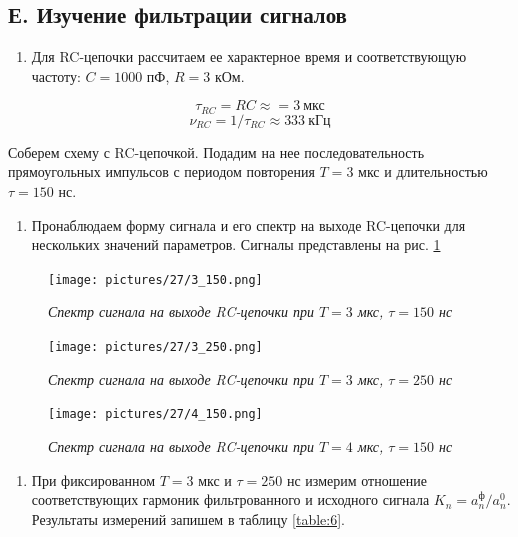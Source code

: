 \documentclass[a4paper,12pt]{article}
\begin{document}
\subsection{Е. Изучение фильтрации сигналов}

\begin{enumerate}[resume]
    \item Для RC-цепочки рассчитаем ее характерное время и соответствующую частоту: $C = 1000$ пФ, $R = 3$ кОм.
\end{enumerate}

\begin{equation*}
    \tau_{RC} = RC \approx = 3 \ \text{мкс}
\end{equation*}
\begin{equation*}
    \nu_{RC} = 1 / \tau_{RC} \approx 333 \ \text{кГц}
\end{equation*}

Соберем схему с RC-цепочкой. Подадим на нее последовательность прямоугольных импульсов с периодом повторения $T = 3$ мкс и длительностью $\tau = 150$ нс.

\begin{enumerate}[resume]
    \item Пронаблюдаем форму сигнала и его спектр на выходе RC-цепочки для нескольких значений параметров. Сигналы представлены на рис. \ref{pic:signal-1}
\end{enumerate}

\FloatBarrier
\begin{figure}[!ht]
        \centering
	\texttt{[image: pictures/27/3\_150.png]}
	\caption{\textit{Спектр сигнала на выходе RC-цепочки при $T = 3$ мкс, $\tau = 150$ нс}}
	\label{pic:signal-1}
\end{figure}

\begin{figure}[!ht]
        \centering
	\texttt{[image: pictures/27/3\_250.png]}
	\caption{\textit{Спектр сигнала на выходе RC-цепочки при $T = 3$ мкс, $\tau = 250$ нс}}
	\label{pic:signal-2}
\end{figure}

\begin{figure}[!ht]
        \centering
	\texttt{[image: pictures/27/4\_150.png]}
	\caption{\textit{Спектр сигнала на выходе RC-цепочки при $T = 4$ мкс, $\tau = 150$ нс}}
	\label{pic:signal-3}
\end{figure}
\FloatBarrier

\clearpage

\begin{enumerate}[resume]
    \item При фиксированном $T = 3$ мкс и $\tau = 250$ нс измерим отношение соответствующих гармоник фильтрованного и исходного сигнала $K_n = a^\text{ф}_n / a^0_n$. Результаты измерений запишем в таблицу \ref{table:6}.
\end{enumerate}
\end{document}
